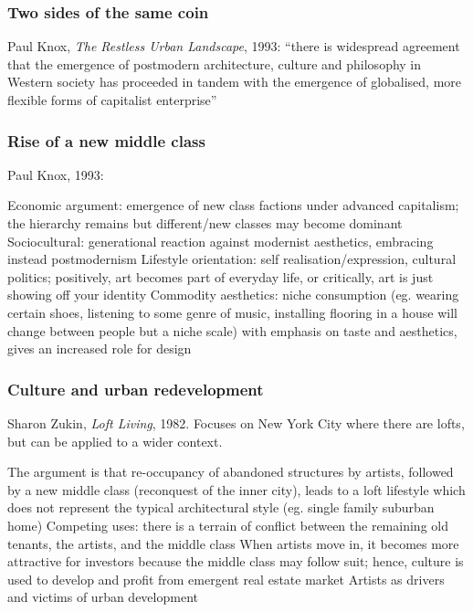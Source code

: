 \documentclass{article}
\begin{document}
\subsubsection{Two sides of the same coin}

Paul Knox, \textit{The Restless Urban Landscape}, 1993: ``there is widespread agreement that the emergence of postmodern architecture, culture and philosophy in Western society has proceeded in tandem with the emergence of globalised, more flexible forms of capitalist enterprise''

\subsubsection{Rise of a new middle class}

Paul Knox, 1993:

\begin{outline}
	\1 Economic argument: emergence of new class factions under advanced capitalism; the hierarchy remains but different/new classes may become dominant
	\1 Sociocultural: generational reaction against modernist aesthetics, embracing instead postmodernism
	\1 Lifestyle orientation: self realisation/expression, cultural politics; positively, art becomes part of everyday life, or critically, art is just showing off your identity
	\1 Commodity aesthetics: niche consumption (eg. wearing certain shoes, listening to some genre of music, installing flooring in a house will change between people but a niche scale) with emphasis on taste and aesthetics, gives an increased role for design
\end{outline}

\subsubsection{Culture and urban redevelopment}

Sharon Zukin, \textit{Loft Living}, 1982. Focuses on New York City where there are lofts, but can be applied to a wider context.

\begin{outline}
	\1 The argument is that re-occupancy of abandoned structures by artists, followed by a new middle class (reconquest of the inner city), leads to a loft lifestyle which does not represent the typical architectural style (eg. single family suburban home)
	\1 Competing uses: there is a terrain of conflict between the remaining old tenants, the artists, and the middle class
	\1 When artists move in, it becomes more attractive for investors because the middle class may follow suit; hence, culture is used to develop and profit from emergent real estate market
	\1 Artists as drivers and victims of urban development
\end{outline}
\end{document}

